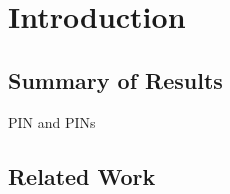 
\chapter{Introduction}  %

\ifpdf
    \graphicspath{{Chapters/Figs/Raster/}{Chapters/Figs/PDF/}{Chapters/Figs/}}
\else
    \graphicspath{{Chapters/Figs/Vector/}{Chapters/Figs/}}
\fi


\section{Summary of Results}

\ac{PIN} and \acp{PIN}


\section{Related Work}
